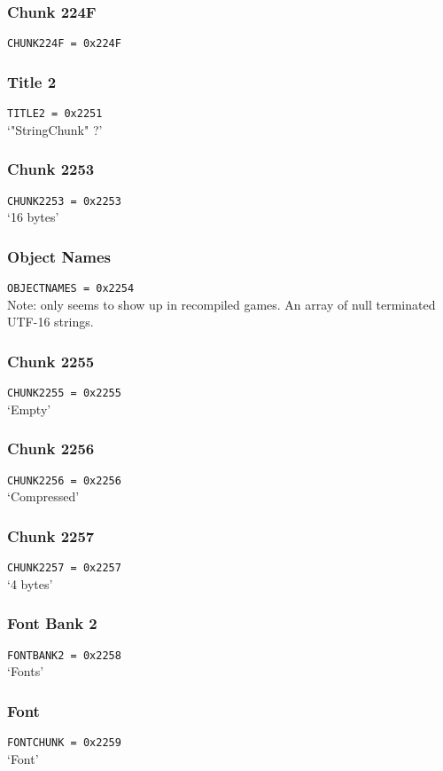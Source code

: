 \documentclass{article}
\begin{document}
\subsubsection{Chunk 224F}
\verb|CHUNK224F = 0x224F|

\subsubsection{Title 2}
\verb|TITLE2 = 0x2251|
\\
`"StringChunk" ?'

\subsubsection{Chunk 2253}
\verb|CHUNK2253 = 0x2253|
\\
`16 bytes'

\subsubsection{Object Names}
\verb|OBJECTNAMES = 0x2254|
\\
Note: only seems to show up in recompiled games.
An array of null terminated UTF-16 strings.

\subsubsection{Chunk 2255}
\verb|CHUNK2255 = 0x2255|
\\
`Empty'

\subsubsection{Chunk 2256}
\verb|CHUNK2256 = 0x2256|
\\
`Compressed'

\subsubsection{Chunk 2257}
\verb|CHUNK2257 = 0x2257|
\\
`4 bytes'

\subsubsection{Font Bank 2}
\verb|FONTBANK2 = 0x2258|
\\
`Fonts'

\subsubsection{Font}
\verb|FONTCHUNK = 0x2259|
\\
`Font'
\end{document}
